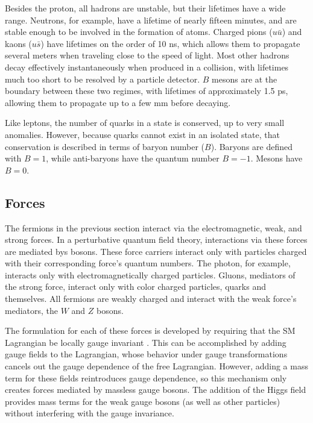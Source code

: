 Besides the proton, all hadrons are unstable, but their lifetimes have a wide range. Neutrons, for example, have a lifetime of nearly fifteen minutes, and are stable enough to be involved in the formation of atoms. Charged pions ($u\bar{u}$) and kaons ($u\bar{s}$) have lifetimes on the order of 10 ns, which allows them to propagate several meters when traveling close to the speed of light. Most other hadrons decay effectively instantaneously when produced in a collision, with lifetimes much too short to be resolved by a particle detector. $B$ mesons are at the boundary between these two regimes, with lifetimes of approximately 1.5 ps, allowing them to propagate up to a few mm before decaying.  

Like leptons, the number of quarks in a state is conserved, up to very small anomalies. However, because quarks cannot exist in an isolated state, that conservation is described in terms of baryon number ($B$). Baryons are defined with $B=1$, while anti-baryons have the quantum number $B=-1$. Mesons have $B = 0$. 

\subsection{Forces}

The fermions in the previous section interact via the electromagnetic, weak, and strong forces. In a perturbative quantum field theory, interactions via these forces are mediated bys bosons. These force carriers interact only with particles charged with their corresponding force's quantum numbers. The photon, for example, interacts only with electromagnetically charged particles. Gluons, mediators of the strong force, interact only with color charged particles, quarks and themselves. All fermions are weakly charged and interact with the weak force's mediators, the $W$ and $Z$ bosons. 

The formulation for each of these forces is developed by requiring that the \ac{SM} Lagrangian be locally gauge invariant \cite{Griffiths:111880}. This can be accomplished by adding gauge fields to the Lagrangian, whose behavior under gauge transformations cancels out the gauge dependence of the free Lagrangian. However, adding a mass term for these fields reintroduces gauge dependence, so this mechanism only creates forces mediated by massless gauge bosons. The addition of the Higgs field provides mass terms for the weak gauge bosons (as well as other particles) without interfering with the gauge invariance. 


